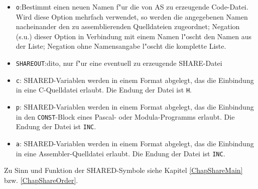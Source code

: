 \documentclass[12pt,a4paper,twoside]{report}
\newcommand{\tty}[1]{{\tt #1}}
\newcommand{\asname}{AS}
\begin{document}
\begin{itemize}
{      wird "ublicherweise zusammen mit der \tty{LISTRADIX}-Option verwendet;
      Listradix 8 zusammen mit einem Punkt als Trenner ergibt die sogenannte
      ''Split-Octal''-Darstellung.}
\item{\tty{o}:Bestimmt einen neuen Namen f"ur die von \asname{} zu erzeugende
      Code-Datei.  Wird diese Option mehrfach verwendet, so werden
      die angegebenen Namen nacheinander den zu assemblierenden
      Quelldateien zugeordnet; Negation (s.u.) dieser Option in
      Verbindung mit einem Namen l"oscht den Namen aus der Liste;
      Negation ohne Namensangabe l"oscht die komplette Liste.}
\item{\tty{SHAREOUT}:dito, nur f"ur eine eventuell zu erzeugende
      SHARE-Datei}
\item{\tty{c}: SHARED-Variablen werden in einem Format abgelegt, das die
      Einbindung in eine C-Quelldatei erlaubt.  Die Endung der Datei
      ist \tty{H}.}
\item{\tty{p}: SHARED-Variablen werden in einem Format abgelegt, das die
      Einbindung in den \tty{CONST}-Block eines Pascal- oder Modula-Programms
      erlaubt.  Die Endung der Datei ist \tty{INC}.}
\item{\tty{a}: SHARED-Variablen werden in einem Format abgelegt, das die
      Einbindung in eine Assembler-Quelldatei erlaubt.  Die Endung
      der Datei ist \tty{INC}.}
\end{itemize}
Zu Sinn und Funktion der SHARED-Symbole siehe Kapitel \ref{ChapShareMain}
bzw. \ref{ChapShareOrder}.
\end{document}
